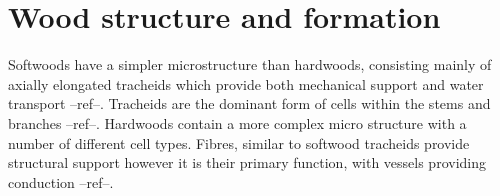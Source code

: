 \section{Wood structure and formation}
Softwoods have a simpler microstructure than hardwoods, consisting mainly of
axially elongated tracheids which provide both mechanical support and water
transport --ref--. Tracheids are the dominant form of cells within the stems and
branches --ref--. Hardwoods contain a more complex micro structure with a number
of different cell types. Fibres, similar to softwood tracheids provide
structural support however it is their primary function, with vessels providing
conduction --ref--.